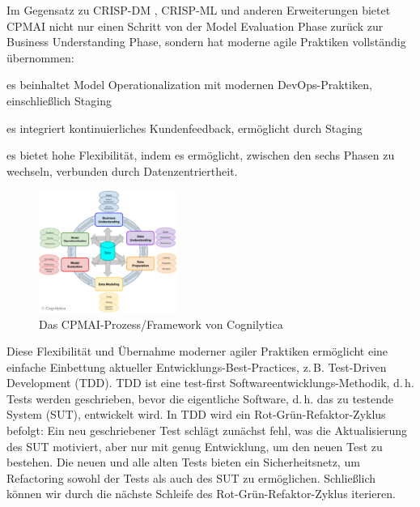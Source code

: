\documentclass[twocolumn]{article}
\begin{document}
Im Gegensatz zu CRISP-DM \cite{CRISP99}, CRISP-ML \cite{Studer21} und anderen Erweiterungen bietet CPMAI nicht nur einen Schritt von der Model Evaluation Phase zurück zur Business Understanding Phase, sondern hat moderne agile Praktiken vollständig übernommen:
\begin{compactitem}
\item es beinhaltet Model Operationalization mit modernen DevOps-Praktiken, einschließlich Staging
\item es integriert kontinuierliches Kundenfeedback, ermöglicht durch Staging
\item es bietet hohe Flexibilität, indem es ermöglicht, zwischen den sechs Phasen zu wechseln, verbunden durch Datenzentriertheit.
\end{compactitem}

\begin{figure}[hbt!]
  \begin{center}
  \vspace{-4mm}
\includegraphics[width=0.4\textwidth]{figures/cpmai}
  \vspace{-4mm}
\caption{Das CPMAI-Prozess/Framework von Cognilytica}
\label{fig:cpmai}
\end{center}
\end{figure}

Diese Flexibilität und Übernahme moderner agiler Praktiken ermöglicht eine einfache Einbettung aktueller Entwicklungs-Best-Practices, z.\,B. Test-Driven Development (TDD). TDD ist eine test-first Softwareentwicklungs-Methodik, d.\,h. Tests werden geschrieben, bevor die eigentliche Software, d.\,h. das zu testende System (SUT), entwickelt wird. In TDD wird ein Rot-Grün-Refaktor-Zyklus befolgt: Ein neu geschriebener Test schlägt zunächst fehl, was die Aktualisierung des SUT motiviert, aber nur mit genug Entwicklung, um den neuen Test zu bestehen. Die neuen und alle alten Tests bieten ein Sicherheitsnetz, um Refactoring sowohl der Tests als auch des SUT zu ermöglichen. Schließlich können wir durch die nächste Schleife des Rot-Grün-Refaktor-Zyklus iterieren.
\end{document}

